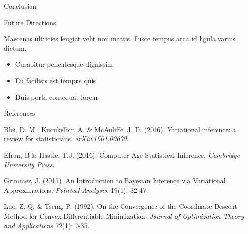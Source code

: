 \documentclass[final]{beamer}
\newlength{\onecolwid}
\begin{document}
\begin{frame}[t]
\begin{columns}[t]
\begin{column}{\onecolwid}
\begin{block}{Conclusion}
\end{block}


\begin{block}{Future Directions}

Maecenas ultricies feugiat velit non mattis. Fusce tempus arcu id ligula varius dictum. 
\begin{itemize}
\item Curabitur pellentesque dignissim
\item Eu facilisis est tempus quis
\item Duis porta consequat lorem
\end{itemize}

\end{block}



\begin{block}{References}


\scriptsize{ %

\noindent[1] Blei, D. M., Kucukelbir, A. \& McAuliffe, J. D. (2016). Variational inference: a review for statisticians. {\itshape arXiv:1601.00670}.

\noindent[2] Efron, B \& Hastie, T.J. (2016). Computer Age Statistical Inference. {\itshape Cambridge University Press}.

\noindent[3] Grimmer, J. (2011). An Introduction to Bayesian Inference via Variational Approximations. {\itshape Political Analysis}. 19(1): 32-47.

\noindent[4] Luo, Z. Q. \& Tseng, P. (1992). On the Convergence of the Coordinate Descent Method for Convex Differentiable Minimization. {\itshape Journal of Optimization Theory and Applications} 72(1): 7-35. 

}
\end{block}
\end{column}
\end{columns}
\end{frame}
\end{document}

